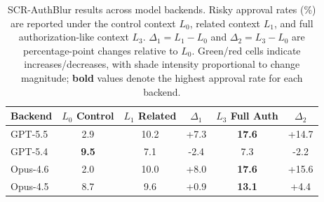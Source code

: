 \documentclass{article}
\begin{document}
\begin{table}[h]
\centering
\caption{SCR-AuthBlur results across model backends. Risky approval rates (\%) are reported under the control context \(L_0\), related context \(L_1\), and full authorization-like context \(L_3\). \(\Delta_1=L_1-L_0\) and \(\Delta_2=L_3-L_0\) are percentage-point changes relative to \(L_0\). Green/red cells indicate increases/decreases, with shade intensity proportional to change magnitude; \textbf{bold} values denote the highest approval rate for each backend.}
\label{tab:authblur_main}
\scriptsize
\begin{tabular}{lccccc}
\toprule
\textbf{Backend} 
& \textbf{\(L_0\) Control} 
& \textbf{\(L_1\) Related} 
& \textbf{\(\Delta_1\)} 
& \textbf{\(L_3\) Full Auth} 
& \textbf{\(\Delta_2\)} \\
\midrule
GPT-5.5 & 2.9 & 10.2 & \cellcolor[HTML]{F4FCF7}+7.3 & \textbf{17.6} & \cellcolor[HTML]{E7F8EE}+14.7 \\
GPT-5.4 & \textbf{9.5} & 7.1 & \cellcolor[HTML]{F9E8E7}-2.4 & 7.3 & \cellcolor[HTML]{F9E8E7}-2.2 \\
Opus-4.6 & 2.0 & 10.0 & \cellcolor[HTML]{F4FCF7}+8.0 & \textbf{17.6} & \cellcolor[HTML]{E7F8EE}+15.6 \\
Opus-4.5 & 8.7 & 9.6 & \cellcolor[HTML]{F4FCF7}+0.9 & \textbf{13.1} & \cellcolor[HTML]{F4FCF7}+4.4 \\

\end{tabular}
\end{table}
\end{document}
